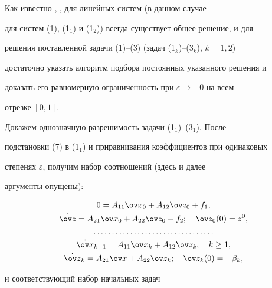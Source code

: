  


Как известно \cite{10}, \cite{11}, для линейных систем (в данном случае 


для систем (1), (1$_1$) и (1$_2$)) всегда существует общее решение, и для 


решения поставленной задачи (1)--(3) (задач (1$_k$)--(3$_k$), $k=1,2$) 


достаточно указать алгоритм подбора постоянных указанного решения и 


доказать его равномерную ограниченность при $\varepsilon\to+0$ на всем 


отрезке $[0,1]$. 


 


Докажем однозначную разрешимость задачи (1$_1$)--(3$_1$). После 


подстановки (7) в (1$_1$) и приравнивания коэффициентов при одинаковых 


степенях $\varepsilon$, получим набор соотношений (здесь и далее 


аргументы опущены): 


\begin{gather*} 


0=A_{11}\ov x_0+A_{12}\ov z_0+f_1,\\ 


% 


\Dot{\ov z}=A_{21}\ov x_0+A_{22}\ov z_0+f_2;\quad 


\ov z_0(0)=z^0, \\ 


% 


\dotsc\dotsc\dotsc\dotsc\dotsc\dotsc\dotsc\dotsc\dotsc\dotsc\dotsc \\ 


\Dot{\ov x}_{k-1}=A_{11}\ov x_k+A_{12}\ov z_k,\quad k\ge1, \\ 


% 


\Dot{\ov z}_k=A_{21}\ov x+A_{22}\ov z_k;\quad 


\ov z_k(0)=-\beta_k, 


\end{gather*} 


и соответствующий набор начальных задач 


